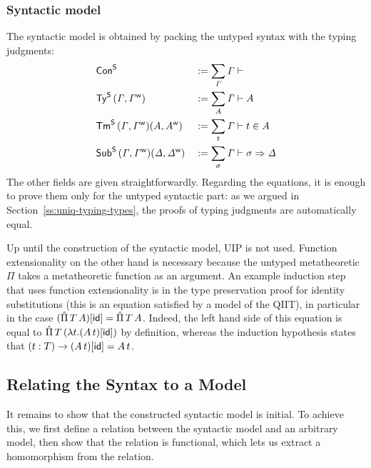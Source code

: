  \subsubsection{Syntactic model}
 The syntactic model is obtained by packing the untyped syntax with the typing
 judgments:
\begin{alignat*}{5}
 & {\mathsf{Con}}^{\mathsf{S}} && := \sum_{\mathit{\Gamma}} \mathit{\Gamma}\vdash
 \\
 & {\mathsf{Ty}}^{\mathsf{S}} \,(\mathit{\Gamma},{\mathit{\Gamma}}^{\mathsf{w}})&& := \sum_A \mathit{\Gamma}\vdash A
 \\
 & {\mathsf{Tm}}^{\mathsf{S}} \,(\mathit{\Gamma},{\mathit{\Gamma}}^{\mathsf{w}})(A,{A}^{\mathsf{w}})&& := \sum_t \mathit{\Gamma}\vdash t \in A
 \\
 & {\mathsf{Sub}}^{\mathsf{S}} \,(\mathit{\Gamma},{\mathit{\Gamma}}^{\mathsf{w}})(\mathit{\Delta},{\mathit{\Delta}}^{\mathsf{w}})&& := \sum_\sigma \mathit{\Gamma}\vdash \sigma \Rightarrow \mathit{\Delta}
\end{alignat*}
The other fields are given straightforwardly.  Regarding the equations, it is
enough to prove them only for the untyped syntactic part: as we argued in
Section~\ref{ss:uniq-typing-types}, the proofs of typing judgments are
automatically equal.

Up until the construction of the syntactic model, UIP is not used. Function
extensionality on the other hand is necessary because the untyped metatheoretic
$\Pi$ takes a metatheoretic function as an argument. An example induction step
that uses function extensionality is in the type preservation proof for identity substitutions (this
is an equation satisfied by a model of the QIIT), in particular in the case
$(\hat{\Pi}\,T\, A)[\mathsf{id}]=\hat{\Pi}\,T\,A$. Indeed, the left hand side of this equation is
equal to $\hat{\Pi}\,T\,(\lambda t.(A\,t)[\mathsf{id}])$ by definition, whereas the induction
hypothesis states that $(t:T)\rightarrow (A\,t)[\mathsf{id}]=A\,t$.

\subsection{Relating the Syntax to a Model}
\label{sec:streicher}
It remains to show that the constructed syntactic model is initial. To achieve
this, we first define a relation between the syntactic model and an arbitrary
model, then show that the relation is functional, which lets us extract a
homomorphism from the relation.

